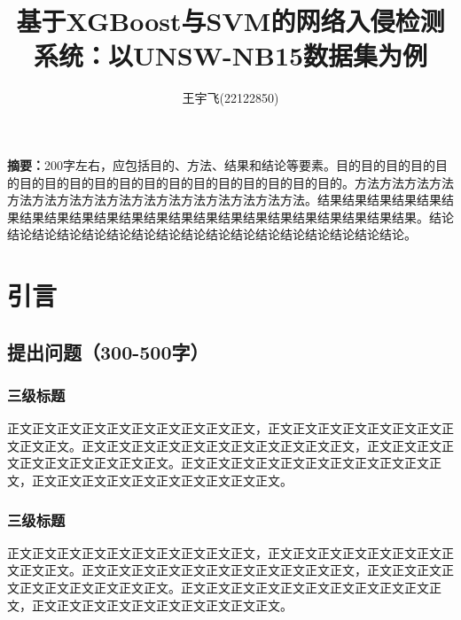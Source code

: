 \documentclass{article}
\title{\textbf{基于XGBoost与SVM的网络入侵检测系统：以UNSW-NB15数据集为例}}
\author{
王宇飞(22122850)
}
\begin{document}
 \songti


\date{}
\maketitle


\begin{center}
\setlength{\textwidth}{15cm}
\parbox{\textwidth}{
\textbf{摘要：}200字左右，应包括目的、方法、结果和结论等要素。目的目的目的目的目的目的目的目的目的目的目的目的目的目的目的目的目的目的。方法方法方法方法方法方法方法方法方法方法方法方法方法方法方法方法。结果结果结果结果结果结果结果结果结果结果结果结果结果结果结果结果结果结果结果结果结果结果。结论结论结论结论结论结论结论结论结论结论结论结论结论结论结论结论结论。
  }
\end{center}

\section{引言}
\subsection{提出问题（300-500字）}
\subsubsection{三级标题}
正文正文正文正文正文正文正文正文正文正文，正文正文正文正文正文正文正文正文正文正文。正文正文正文正文正文正文正文正文正文正文正文，正文正文正文正文正文正文正文正文正文正文。正文正文正文正文正文正文正文正文正文正文正文，正文正文正文正文正文正文正文正文正文正文。\cite{ref1}

\subsubsection{三级标题}
正文正文正文正文正文正文正文正文正文正文，正文正文正文正文正文正文正文正文正文正文。正文正文正文正文正文正文正文正文正文正文正文，正文正文正文正文正文正文正文正文正文正文。正文正文正文正文正文正文正文正文正文正文正文，正文正文正文正文正文正文正文正文正文正文。
\end{document}
